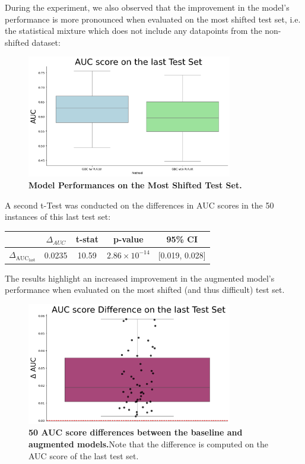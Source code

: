 During the experiment, we also observed that the improvement in the model's performance is more pronounced when evaluated on the most shifted test set, i.e. the statistical mixture which does not include any datapoints from the non-shifted dataset:

\begin{figure}[H]
    \centering
    \includegraphics[width=0.8\textwidth]{assets/MeanAUCscoreLAST.png} 
    \caption{\textbf{Model Performances on the Most Shifted Test Set.}}
\end{figure}

A second t-Test was conducted on the differences in AUC scores in the 50 instances of this last test set:


\begin{table}[H]
    \centering
    \begin{tabular}{lcccc}
        \toprule
        & $\Delta_{AUC}$ & t-stat & p-value & 95\% CI \\
        \midrule
        $\Delta_{\text{AUC}_{\text{last}}}$ & 0.0235 & 10.59 & $2.86 \times 10^{-14}$ & [0.019, 0.028] \\
        \bottomrule
    \end{tabular}
\end{table}

The results highlight an increased improvement in the augmented model's performance when evaluated on the most shifted (and thus difficult) test set. 

\begin{figure}[H]
    \centering
    \includegraphics[width=0.8\textwidth]{assets/meandiffLAST.png} 
    \caption{\textbf{50 AUC score differences between the baseline and augmented models.}Note that the difference is computed on the AUC score of the last test set.}
\end{figure}


